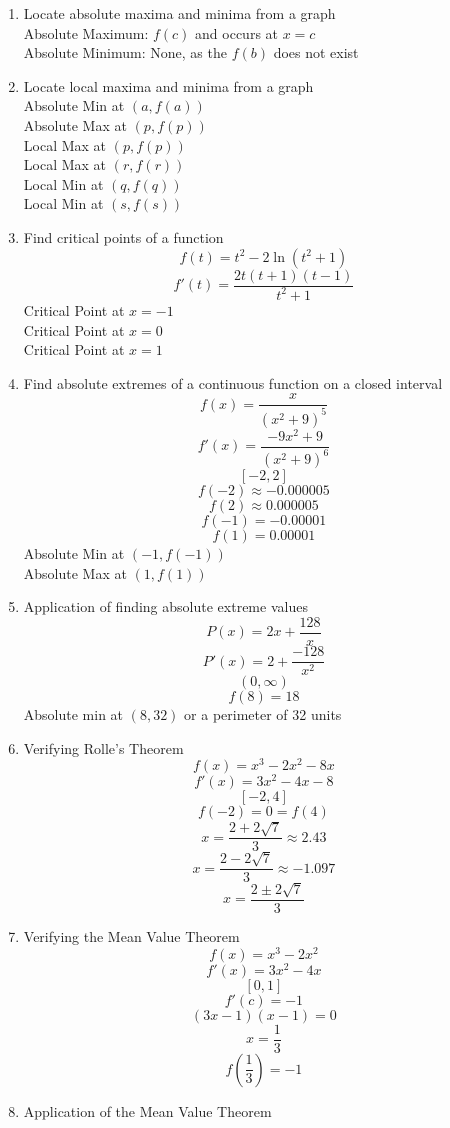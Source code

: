 \documentclass{article}
\begin{document}
\begin{enumerate}
    \item Locate absolute maxima and minima from a graph \\
    Absolute Maximum: $f(c)$ and occurs at $x = c$ \\
    Absolute Minimum: None, as the $f(b)$ does not exist
    \item Locate local maxima and minima from a graph \\
    Absolute Min at $(a, f(a))$ \\
    Absolute Max at $(p, f(p))$ \\
    Local Max at $(p, f(p))$ \\
    Local Max at $(r, f(r))$ \\
    Local Min at $(q, f(q))$ \\
    Local Min at $(s, f(s))$
    \item Find critical points of a function
    $$f(t) = t^2 - 2\ln{\left(t^2 + 1\right)}$$
    $$f'(t) = \frac{2t\left(t+1\right)\left(t-1\right)}{t^2 + 1}$$
    Critical Point at $x = -1$ \\
    Critical Point at $x = 0$ \\
    Critical Point at $x = 1$
    \item Find absolute extremes of a continuous function on a closed interval
    $$f(x) = \frac{x}{\left(x^2 + 9\right)^5}$$
    $$f'(x) = \frac{-9x^2 + 9}{\left(x^2 + 9\right)^6}$$
    $$[-2, 2]$$
    $$f(-2) \approx -0.000005$$
    $$f(2) \approx 0.000005$$
    $$f(-1) = -0.00001$$
    $$f(1) = 0.00001$$
    Absolute Min at $(-1, f(-1))$ \\
    Absolute Max at $(1, f(1))$
    \item Application of finding absolute extreme values
    $$P(x) = 2x + \frac{128}{x}$$
    $$P'(x) = 2 + \frac{-128}{x^2}$$
    $$(0, \infty)$$
    $$f(8) = 18$$
    Absolute min at $(8, 32)$ or a perimeter of 32 units
    \item Verifying Rolle's Theorem
    $$f(x) = x^3 - 2x^2 - 8x$$
    $$f'(x) = 3x^2 - 4x - 8$$
    $$[-2, 4]$$
    $$f(-2) = 0 = f(4)$$
    $$x = \frac{2 + 2\sqrt{7}}{3} \approx 2.43$$
    $$x = \frac{2 - 2\sqrt{7}}{3} \approx -1.097$$
    $$x = \frac{2 \pm 2\sqrt{7}}{3}$$
    \item Verifying the Mean Value Theorem
    $$f(x) = x^3 - 2x^2$$
    $$f'(x) = 3x^2 - 4x$$
    $$[0, 1]$$
    $$f'(c) = -1$$
    $$(3x - 1)(x - 1) = 0$$
    $$x = \frac{1}{3}$$
    $$f\left(\frac{1}{3}\right) = -1$$
    \item Application of the Mean Value Theorem

\end{enumerate}
\end{document}
